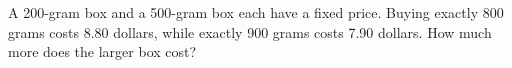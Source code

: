A 200-gram box and a 500-gram box each have a fixed price. Buying exactly 800 grams costs 8.80 dollars, while exactly 900 grams costs 7.90 dollars. How much more does the larger box cost?
